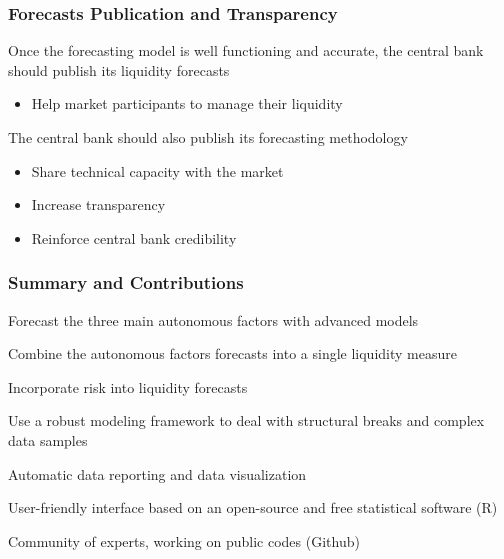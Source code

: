 \documentclass{beamer}
\newenvironment{wideitemize}{\itemize\addtolength{\itemsep}{10pt}}{\enditemize}
\newenvironment{wideenumerate}{\enumerate\addtolength{\itemsep}{10pt}}{\endenumerate}
\begin{document}
\begin{frame}
  \frametitle{Forecasts Publication and Transparency}

  \begin{wideitemize}
  \item Once the forecasting model is well functioning and accurate, the central bank should publish its liquidity forecasts
    \begin{itemize}
    \item Help market participants to manage their liquidity
    \end{itemize}

  \item The central bank should also publish its forecasting methodology
    \begin{itemize}
    \item Share technical capacity with the market
    \item Increase transparency
    \item Reinforce central bank credibility
    \end{itemize}    
  \end{wideitemize}
  
\end{frame}


\begin{frame}
  \frametitle{Summary and Contributions}
  \begin{wideenumerate}
    \item Forecast the three main autonomous factors with advanced models
    \item Combine the autonomous factors forecasts into a single liquidity measure
    \item Incorporate risk into liquidity forecasts
    \item Use a robust modeling framework to deal with structural breaks and complex data samples
    \item Automatic data reporting and data visualization
    \item User-friendly interface based on an open-source and free statistical software (R)
    \item Community of experts, working on public codes (Github)
  \end{wideenumerate}
\end{frame}
\end{document}
